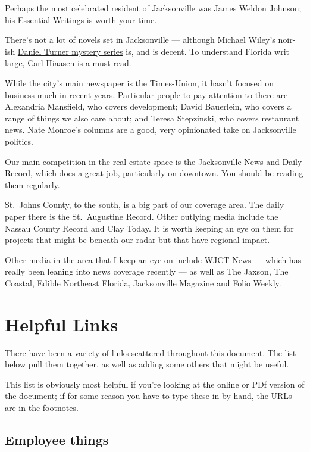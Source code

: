 \documentclass[
  11pt,
  american,
  letterpaperpaper,
  extrafontsizes,onecolumn,openright
  ]{memoir}
\begin{document}
Perhaps the most celebrated resident of Jacksonville was James Weldon Johnson; his \href{https://www.amazon.com/Essential-Writings-Johnson-Library-Classics/dp/0812975324/ref=sr_1_1}{Essential Writings} is worth your time.

There's not a lot of novels set in Jacksonville --- although Michael Wiley's noir-ish \href{https://www.amazon.com/dp/B07PLPNSCH}{Daniel Turner mystery series} is, and is decent. To understand Florida writ large, \href{https://www.amazon.com/stores/Carl-Hiaasen/author/B00KWZGGAG}{Carl Hiaasen} is a must read.

While the city's main newspaper is the Times-Union, it hasn't focused on business much in recent years. Particular people to pay attention to there are Alexandria Mansfield, who covers development; David Bauerlein, who covers a range of things we also care about; and Teresa Stepzinski, who covers restaurant news. Nate Monroe's columns are a good, very opinionated take on Jacksonville politics.

Our main competition in the real estate space is the Jacksonville News and Daily Record, which does a great job, particularly on downtown. You should be reading them regularly.

St.~Johns County, to the south, is a big part of our coverage area. The daily paper there is the St.~Augustine Record. Other outlying media include the Nassau County Record and Clay Today. It is worth keeping an eye on them for projects that might be beneath our radar but that have regional impact.

Other media in the area that I keep an eye on include WJCT News --- which has really been leaning into news coverage recently --- as well as The Jaxson, The Coastal, Edible Northeast Florida, Jacksonville Magazine and Folio Weekly.

\hypertarget{helpful-links}{%
\chapter{Helpful Links}\label{helpful-links}}

There have been a variety of links scattered throughout this document. The list below pull them together, as well as adding some others that might be useful.

This list is obviously most helpful if you're looking at the online or PDf version of the document; if for some reason you have to type these in by hand, the URLs are in the footnotes.

\hypertarget{employee-things}{%
\section*{Employee things}\label{employee-things}}
\end{document}
